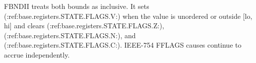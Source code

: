 FBNDII treats both bounds as inclusive. It sets (:ref:base.registers.STATE.FLAGS.V:) when the value is unordered or outside [lo, hi] and clears (:ref:base.registers.STATE.FLAGS.Z:), (:ref:base.registers.STATE.FLAGS.N:), and (:ref:base.registers.STATE.FLAGS.C:). IEEE-754 FFLAGS causes continue to accrue independently.

